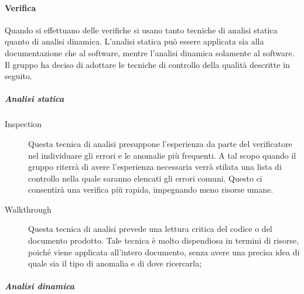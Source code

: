 \documentclass[../PianoDiQualifica.tex]{subfiles}
\begin{document}
				\paragraph{Verifica}
				 Quando si effettuano delle verifiche si usano tanto tecniche di analisi statica quanto di analisi dinamica. L'analisi statica può essere applicata sia alla documentazione che al software, mentre l'analisi dinamica solamente al software. Il gruppo ha deciso di adottare le tecniche di controllo della qualità descritte in seguito.
				 \subparagraph{Analisi statica}
					\begin{description}
						\item[Inspection] Questa tecnica di analisi presuppone l'esperienza da parte del verificatore nel individuare gli errori e le anomalie più frequenti. A tal scopo quando il gruppo riterrà di avere l'esperienza necessaria verrà stilata una lista di controllo nella quale saranno elencati gli errori comuni. Questo ci consentirà una verifica più rapida, impegnando meno risorse umane.
						\item[Walkthrough] Questa tecnica di analisi prevede una lettura critica del codice o del documento prodotto. Tale tecnica è molto dispendiosa in termini di risorse, poiché viene applicata all'intero documento, senza avere una precisa idea di quale sia il tipo di anomalia e di dove ricercarla;
					\end{description}
					\subparagraph{Analisi dinamica}
\end{document}
